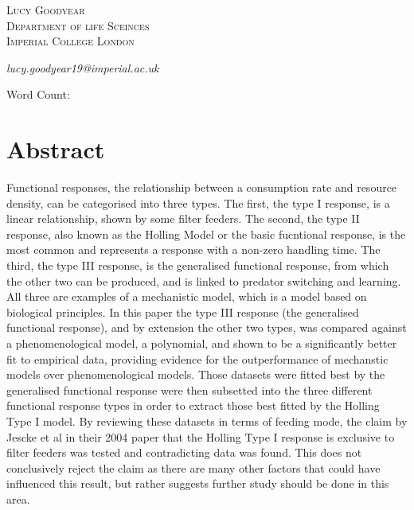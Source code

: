 \documentclass[11pt, a4paper, titlepage]{article}
\newcommand\wordcount{}
\begin{document}
\begin{titlepage}
	
	
	
	\vspace{0.5\baselineskip} %
	
	{\scshape\Large Lucy Goodyear\\
		Department of life Sceinces \\
		Imperial College London\\} %
	
	\textit{lucy.goodyear19@imperial.ac.uk}
	\date{}
	
	\vspace*{3\baselineskip} %
	
	Word Count: \wordcount
	
\end{titlepage}
	
\section*{Abstract}
Functional responses, the relationship between a consumption rate and resource density, can be categorised into three types. The first, the type I response, is a linear relationship, shown by some filter feeders. The second, the type II response, also known as the Holling Model or the basic fucntional response, is the most common and represents a response with a non-zero handling time. The third, the type III response, is the generalised functional response, from which the other two can be produced, and is linked to predator switching and learning. All three are examples of a mechanistic model, which is a model based on biological principles. In this paper the type III response (the generalised functional response), and by extension the other two types, was compared against a phenomenological model, a polynomial, and shown to be a significantly better fit to empirical data, providing evidence for the outperformance of mechanstic models over phenomenological models. Those datasets were fitted best by the generalised functional response were then subsetted into the three different functional response types in order to extract those best fitted by the Holling Type I model. By reviewing these datasets in terms of feeding mode, the claim by Jescke et al in their 2004 paper that the Holling Type I response is exclusive to filter feeders was tested and contradicting data was found. This does not conclusively reject the claim as there are many other factors that could have influenced this result, but rather suggests further study should be done in this area.
\end{document}
